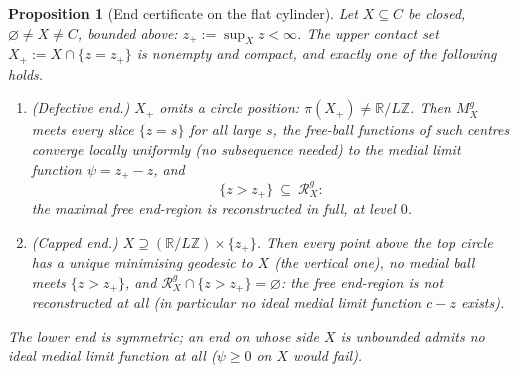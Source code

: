 \documentclass[11pt]{article}
\newtheorem{proposition}[theorem]{Proposition}
\theoremstyle{remark}
\newcommand{\R}{\mathbb{R}}
\newcommand{\X}{X}
\newcommand{\Mg}{M^{g}_{\X}}
\newcommand{\Rg}{\mathcal{R}^{g}_{\X}}
\begin{document}
\begin{proposition}[End certificate on the flat cylinder]
\label{prop:cylinder}
Let $\X\subseteq C$ be closed, $\varnothing\neq\X\neq C$, bounded
above: $z_{+}:=\sup_{\X}z<\infty$. The upper contact set
$\X_{+}:=\X\cap\{z=z_{+}\}$ is nonempty and compact, and exactly one
of the following holds.
\begin{enumerate}[label=\textup{(\roman*)}]
\item\emph{(Defective end.)} $\X_{+}$ omits a circle position:
$\pi(\X_{+})\neq\R/L\mathbb{Z}$. Then $\Mg$ meets every slice
$\{z=s\}$ for all large $s$, the free-ball functions of such centres
converge locally uniformly (no subsequence needed) to the medial
limit function $\psi=z_{+}-z$, and
\[
  \{z>z_{+}\}\ \subseteq\ \Rg :
\]
the maximal free end-region is reconstructed in full, at level $0$.
\item\emph{(Capped end.)} $\X\supseteq(\R/L\mathbb{Z})\times
\{z_{+}\}$. Then every point above the top circle has a unique
minimising geodesic to $\X$ (the vertical one), no medial ball meets
$\{z>z_{+}\}$, and $\Rg\cap\{z>z_{+}\}=\varnothing$: the free
end-region is not reconstructed at all (in particular no ideal
medial limit function $c-z$ exists).
\end{enumerate}
The lower end is symmetric; an end on whose side $\X$ is unbounded
admits no ideal medial limit function at all ($\psi\ge0$ on $\X$
would fail).
\end{proposition}
\end{document}
